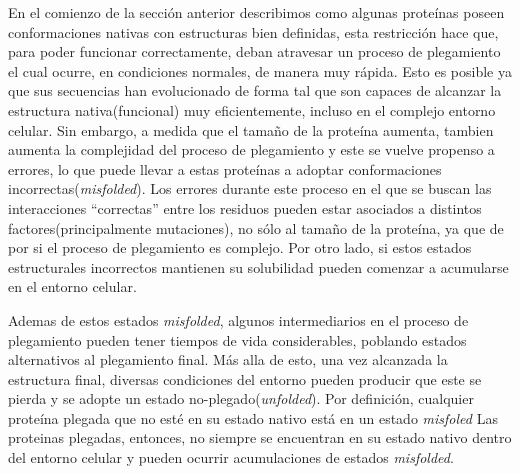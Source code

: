 En el comienzo de la sección anterior describimos como algunas proteínas poseen conformaciones nativas con estructuras bien definidas,
esta restricción hace que, para poder funcionar correctamente, deban atravesar un proceso de plegamiento el cual ocurre, en condiciones normales, de manera muy rápida. 
Esto es posible ya que sus secuencias han evolucionado de forma tal que son capaces de alcanzar la estructura nativa(funcional) muy eficientemente, incluso en el complejo entorno celular.
Sin embargo, a medida que el tamaño de la proteína aumenta, tambien aumenta la complejidad del proceso de plegamiento y este se vuelve propenso a errores,
lo que puede llevar a estas proteínas a adoptar conformaciones incorrectas(\textit{misfolded}). 
Los errores durante este proceso en el que se buscan las interacciones ``correctas'' entre los residuos pueden estar asociados a distintos factores(principalmente mutaciones), 
no sólo al tamaño de la proteína, ya que de por si el proceso de plegamiento es complejo. 
Por otro lado, si estos estados estructurales incorrectos mantienen su solubilidad pueden comenzar a acumularse en el entorno celular.


Ademas de estos estados \textit{misfolded}, algunos intermediarios en el proceso de plegamiento pueden tener tiempos de vida considerables, poblando estados alternativos al plegamiento final.
Más alla de esto, una vez alcanzada la estructura final, diversas condiciones del entorno pueden producir que este se pierda y se adopte un estado no-plegado(\textit{unfolded}).
Por definición, cualquier proteína plegada que no esté en su estado nativo está en un estado \textit{misfoled}
Las proteinas plegadas, entonces, no siempre se encuentran en su estado nativo dentro del entorno celular y pueden ocurrir acumulaciones de estados \textit{misfolded}.

